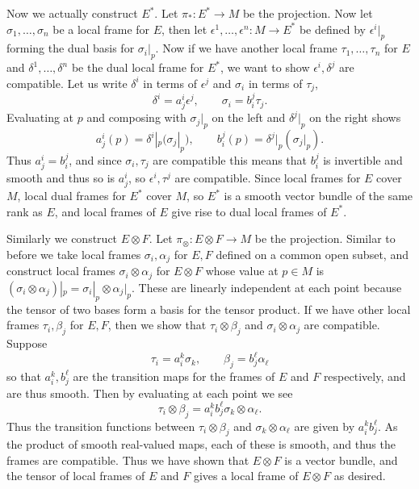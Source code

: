     Now we actually construct $E^*$.
    Let $\pi_*\colon E^*\to M$ be the projection.
    Now let $\sigma_1,\dots,\sigma_n$ be a local frame for $E$, then let $\epsilon^1,\dots,\epsilon^n\colon M\to E^*$ be defined by $\epsilon^i|_p$ forming the dual basis for $\sigma_i|_p$.
    Now if we have another local frame $\tau_1,\dots,\tau_n$ for $E$ and $\delta^1,\dots,\delta^n$ be the dual local frame for $E^*$, we want to show $\epsilon^i,\delta^j$ are compatible.
    Let us write $\delta^i$ in terms of $\epsilon^j$ and $\sigma_i$ in terms of $\tau_j$,
    $$ \delta^i = a^i_j\epsilon^j,\qquad \sigma_i = b^j_i\tau_j . $$
    Evaluating at $p$ and composing with $\sigma_j|_p$ on the left and $\delta^j|_p$ on the right shows
    $$ a^i_j(p) = \delta^i|_p(\sigma_j|_p),\qquad b^j_i(p) = \delta^j|_p(\sigma_j|_p) . $$
    Thus $a^i_j=b^j_i$, and since $\sigma_i,\tau_j$ are compatible this means that $b^j_i$ is invertible and smooth and thus so is $a^i_j$, so $\epsilon^i,\tau^j$ are compatible.
    Since local frames for $E$ cover $M$, local dual frames for $E^*$ cover $M$, so $E^*$ is a smooth vector bundle of the same rank as $E$, and local frames of $E$ give rise to dual local frames of $E^*$.

    Similarly we construct $E\otimes F$.
    Let $\pi_\otimes\colon E\otimes F\to M$ be the projection.
    Similar to before we take local frames $\sigma_i,\alpha_j$ for $E,F$ defined on a common open subset, and construct local frames $\sigma_i\otimes\alpha_j$ for $E\otimes F$ whose value at $p\in M$ is $(\sigma_i\otimes\alpha_j)|_p=\sigma_i|_p\otimes\alpha_j|_p$.
    These are linearly independent at each point because the tensor of two bases form a basis for the tensor product.
    If we have other local frames $\tau_i,\beta_j$ for $E,F$, then we show that $\tau_i\otimes\beta_j$ and $\sigma_i\otimes\alpha_j$ are compatible.
    Suppose
    $$ \tau_i = a^k_i\sigma_k,\qquad \beta_j = b^\ell_j\alpha_\ell $$
    so that $a^k_i,b^\ell_j$ are the transition maps for the frames of $E$ and $F$ respectively, and are thus smooth.
    Then by evaluating at each point we see
    $$ \tau_i\otimes\beta_j = a^k_ib^\ell_j \sigma_k\otimes\alpha_\ell . $$
    Thus the transition functions between $\tau_i\otimes\beta_j$ and $\sigma_k\otimes\alpha_\ell$ are given by $a^k_ib^\ell_j$.
    As the product of smooth real-valued maps, each of these is smooth, and thus the frames are compatible.
    Thus we have shown that $E\otimes F$ is a vector bundle, and the tensor of local frames of $E$ and $F$ gives a local frame of $E\otimes F$ as desired.
\eenum



